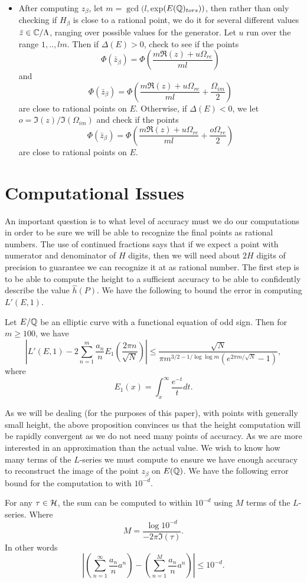 \begin{itemize}
\item{} After computing $z_\beta$, let $m = \gcd(l,$exp$(E(\mathbb{Q})_{tors}))$, then rather than only checking if $H_\beta$ is close to a rational point, we do it for several different values $\bar{z} \in \mathbb{C}/\Lambda$, ranging over possible values for the generator.  Let $u$ run over the range $1,..,lm$. Then if $\Delta(E) > 0$, check to see if the points
$$\Phi(\bar{z}_\beta) = \Phi\left(\frac{m\Re(z) + u \Omega_{re}}{ml}\right)$$
and
$$\Phi(\bar{z}_\beta) = \Phi\left(\frac{m\Re(z) + u \Omega_{re}}{ml} + \frac{\Omega_{im}}{2}\right)$$
are close to rational points on $E$. Otherwise, if $\Delta(E) < 0$, we let $o = \Im(z)/\Im(\Omega_{im})$ and check if the points
$$\Phi(\bar{z}_\beta) = \Phi\left(\frac{m\Re(z) + u \Omega_{re}}{ml} + \frac{o \Omega_{re}}{2}\right)$$
are close to rational points on $E$.
\end{itemize}

\section{Computational Issues}
An important question is to what level of accuracy must we do our computations in order to be sure we will be able to recognize the final points as rational numbers. The use of continued fractions says that if we expect a point with numerator and denominator of $H$ digits, then we will need about $2H$ digits of precision to guarantee we can recognize it at as rational number. The first step is to be able to compute the height to a sufficient accuracy to be able to confidently describe the value $\hat{h}(P)$. We have the following to bound the error in computing $L'(E,1)$.
\begin{prop} Let $E/\mathbb{Q}$ be an elliptic curve with a functional equation of odd sign. Then for $m \geq 100$, we have
$$\left|L'(E,1)-2 \sum_{n=1}^{m}\frac{a_n}{n}E_1\left(\frac{2\pi n}{\sqrt{N}}\right)\right| \leq \frac{\sqrt{N}}{\pi m^{3/2-1/\log\log m}(e^{2\pi m/\sqrt{N}} -1)},$$
where
$$E_1(x) = \int_x^\infty \frac{e^{-t}}{t}dt.$$
\end{prop}
As we will be dealing (for the purposes of this paper), with points with generally small height, the above proposition convinces us that the height computation will be rapidly convergent as we do not need many points of accuracy. As we are more interested in an approximation than the actual value. We wish to know how many terms of the $L$-series we must compute to ensure we have enough accuracy to reconstruct the image of the point $z_\beta$ on $E(\mathbb{Q})$. We have the following error bound for the computation to with $10^{-d}$.
\begin{prop} For any $\tau \in \mathcal{H}$, the sum can be computed to within $10^{-d}$ using $M$ terms of the $L$-series. Where
$$M = \frac{\log 10^{-d}}{-2\pi \Im(\tau)}.$$
In other words
$$\left| \left(\sum_{n=1}^{\infty} \frac{a_n}{n}a^n\right) - \left(\sum_{n=1}^{M} \frac{a_n}{n}a^n\right)\right| \leq 10^{-d}.$$
\end{prop}


